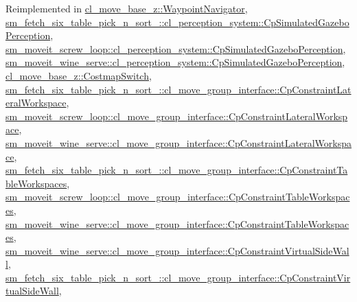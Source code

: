Reimplemented in \hyperlink{classcl__move__base__z_1_1WaypointNavigator_ac60ecf63f7a2a84f3ef51f04cc222a70}{cl\+\_\+move\+\_\+base\+\_\+z\+::\+Waypoint\+Navigator}, \hyperlink{classsm__fetch__six__table__pick__n__sort__1_1_1cl__perception__system_1_1CpSimulatedGazeboPerception_a59ebcf12c7fe1f7933ae4d741bc8aaea}{sm\+\_\+fetch\+\_\+six\+\_\+table\+\_\+pick\+\_\+n\+\_\+sort\+\_\+::cl\+\_\+perception\+\_\+system\+::\+Cp\+Simulated\+Gazebo\+Perception}, \hyperlink{classsm__moveit__screw__loop_1_1cl__perception__system_1_1CpSimulatedGazeboPerception_a7a683c96ef7ea9e26e856f104c3b8249}{sm\+\_\+moveit\+\_\+screw\+\_\+loop\+::cl\+\_\+perception\+\_\+system\+::\+Cp\+Simulated\+Gazebo\+Perception}, \hyperlink{classsm__moveit__wine__serve_1_1cl__perception__system_1_1CpSimulatedGazeboPerception_ad2360e1481edc4bd5732bb0e6deacea6}{sm\+\_\+moveit\+\_\+wine\+\_\+serve\+::cl\+\_\+perception\+\_\+system\+::\+Cp\+Simulated\+Gazebo\+Perception}, \hyperlink{classcl__move__base__z_1_1CostmapSwitch_ad4d125cd563ed0bb76d27226bc47e63e}{cl\+\_\+move\+\_\+base\+\_\+z\+::\+Costmap\+Switch}, \hyperlink{classsm__fetch__six__table__pick__n__sort__1_1_1cl__move__group__interface_1_1CpConstraintLateralWorkspace_ab6a7532f9f5c0a52eb149177dcadfeb2}{sm\+\_\+fetch\+\_\+six\+\_\+table\+\_\+pick\+\_\+n\+\_\+sort\+\_\+::cl\+\_\+move\+\_\+group\+\_\+interface\+::\+Cp\+Constraint\+Lateral\+Workspace}, \hyperlink{classsm__moveit__screw__loop_1_1cl__move__group__interface_1_1CpConstraintLateralWorkspace_ab43b6ae4f92d8b5bf498e5538629f26f}{sm\+\_\+moveit\+\_\+screw\+\_\+loop\+::cl\+\_\+move\+\_\+group\+\_\+interface\+::\+Cp\+Constraint\+Lateral\+Workspace}, \hyperlink{classsm__moveit__wine__serve_1_1cl__move__group__interface_1_1CpConstraintLateralWorkspace_ab9fdca51abefbd7f99a4f9e858e3db7f}{sm\+\_\+moveit\+\_\+wine\+\_\+serve\+::cl\+\_\+move\+\_\+group\+\_\+interface\+::\+Cp\+Constraint\+Lateral\+Workspace}, \hyperlink{classsm__fetch__six__table__pick__n__sort__1_1_1cl__move__group__interface_1_1CpConstraintTableWorkspaces_a546bdfe3331f1b3c286d4d41cc3deccf}{sm\+\_\+fetch\+\_\+six\+\_\+table\+\_\+pick\+\_\+n\+\_\+sort\+\_\+::cl\+\_\+move\+\_\+group\+\_\+interface\+::\+Cp\+Constraint\+Table\+Workspaces}, \hyperlink{classsm__moveit__screw__loop_1_1cl__move__group__interface_1_1CpConstraintTableWorkspaces_aaf31156acbb0c4acb0626807b92d8e3e}{sm\+\_\+moveit\+\_\+screw\+\_\+loop\+::cl\+\_\+move\+\_\+group\+\_\+interface\+::\+Cp\+Constraint\+Table\+Workspaces}, \hyperlink{classsm__moveit__wine__serve_1_1cl__move__group__interface_1_1CpConstraintTableWorkspaces_a7bb129fe7744909e2238ed94e61e3c30}{sm\+\_\+moveit\+\_\+wine\+\_\+serve\+::cl\+\_\+move\+\_\+group\+\_\+interface\+::\+Cp\+Constraint\+Table\+Workspaces}, \hyperlink{classsm__moveit__wine__serve_1_1cl__move__group__interface_1_1CpConstraintVirtualSideWall_a834e3d1e6b683cbacfaafc40847df9fa}{sm\+\_\+moveit\+\_\+wine\+\_\+serve\+::cl\+\_\+move\+\_\+group\+\_\+interface\+::\+Cp\+Constraint\+Virtual\+Side\+Wall}, \hyperlink{classsm__fetch__six__table__pick__n__sort__1_1_1cl__move__group__interface_1_1CpConstraintVirtualSideWall_a409f2624001978e120faa2f79d7e150e}{sm\+\_\+fetch\+\_\+six\+\_\+table\+\_\+pick\+\_\+n\+\_\+sort\+\_\+::cl\+\_\+move\+\_\+group\+\_\+interface\+::\+Cp\+Constraint\+Virtual\+Side\+Wall}, 